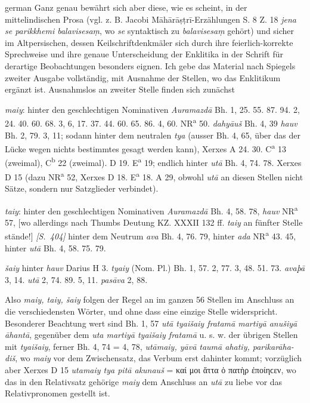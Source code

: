 \begin{otherlanguage*}{german}
Ganz genau bewährt sich aber diese, wie es scheint, in der mittelindischen Prosa (vgl. z. B. Jacobi Māhārāṣṭrī-Erzählungen S. 8 Z. 18 \emph{jena se parikkhemi balavisesaṃ}, wo \emph{se} syntaktisch zu \emph{balavisesaṃ} gehört) und sicher im Altpersischen, dessen Keilschriftdenkmäler sich durch ihre feierlich-korrekte Sprechweise und ihre genaue Unterscheidung der Enklitika in der Schrift für derartige Beobachtungen besonders eignen. Ich gebe das Material nach Spiegels zweiter Ausgabe vollständig, mit Ausnahme der Stellen, wo das Enklitikum ergänzt ist. Ausnahmslos an zweiter Stelle finden sich zunächst

\emph{maiy}: hinter den geschlechtigen Nominativen \emph{Auramazdā} Bh. 1, 25. 55. 87. 94. 2, 24. 40. 60. 68. 3, 6, 17. 37. 44. 60. 65. 86. 4, 60. NR\textsuperscript{a} 50. \emph{dahyāuš} Bh. 4, 39 \emph{hauv} Bh. 2, 79. 3, 11; sodann hinter dem neutralen \emph{tya} (ausser Bh. 4, 65, über das der Lücke wegen nichts bestimmtes gesagt werden kann), Xerxes A 24. 30. C\textsuperscript{a} 13 (zweimal), C\textsuperscript{b} 22 (zweimal). D 19. E\textsuperscript{a} 19; endlich hinter \emph{utā} Bh. 4, 74. 78. Xerxes D 15 (dazu NR\textsuperscript{a} 52, Xerxes D 18. E\textsuperscript{a} 18. A 29, obwohl \emph{utā} an diesen Stellen nicht Sätze, sondern nur Satzglieder verbindet).

\emph{taiy}: hinter den geschlechtigen Nominativen \emph{Auramazdā} Bh. 4, 58. 78, \emph{hauv} NR\textsuperscript{a} 57, [wo allerdings nach Thumbs Deutung KZ. XXXII 132 ff. \emph{taiy} an fünfter Stelle stände!] \hypertarget{p404}{\emph{[S.~404]}}\label{p404} hinter dem Neutrum \emph{ava} Bh. 4, 76. 79, hinter \emph{ada} NR\textsuperscript{a} 43. 45, hinter \emph{utā} Bh. 4, 58. 75. 79.

\emph{šaiy} hinter \emph{hauv} Darius H 3. \emph{tyaiy} (Nom. Pl.) Bh. 1, 57. 2, 77. 3, 48. 51. 73. \emph{avaþā} 3, 14. \emph{utā} 2, 74. 89. 5, 11. \emph{pasāva} 2, 88.

Also \emph{maiy, taiy, šaiy} folgen der Regel an im ganzen 56 Stellen im Anschluss an die verschiedensten Wörter, und ohne dass eine einzige Stelle widerspricht. Besonderer Beachtung wert sind Bh. 1, 57 \emph{utā tyaišaiy fratamā martiyā anušiyā āhantā}, gegenüber dem \emph{uta martiyā tyaišaiy fratamā} u. s. w. der übrigen Stellen mit \emph{tyaišaiy}, ferner Bh. 4, 74 = 4, 78, \emph{utāmaiy, yāvā taumā ahatiy, parikarāha-diš}, wo \emph{maiy} vor dem Zwischensatz, das Verbum erst dahinter kommt; vorzüglich aber Xerxes D 15 \emph{utamaiy tya pitā akunauš} = καί μοι ἅττα ὁ πατὴρ ἐποίηϲεν, wo das in den Relativsatz gehörige \emph{maiy} dem Anschluss an \emph{utā} zu liebe vor das Relativpronomen gestellt ist.


\end{otherlanguage*}
